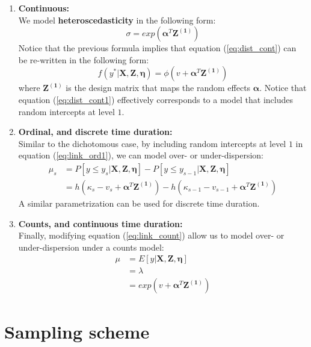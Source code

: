 \begin{enumerate}
	\item \textbf{Continuous:} \\
	We model \textbf{heteroscedasticity} in the following form:
	\begin{equation} \label{eq:het_cont}
		\sigma = exp(\pmb{\alpha}^{T}\mathbf{Z^{(1)}})
	\end{equation}
	Notice that the previous formula implies that equation (\ref{eq:dist_cont}) can be re-written in the following form:
	\begin{equation} \label{eq:dist_cont1}
		f(y^{*}| \mathbf{X}, \mathbf{Z}, \pmb{\eta}) = \phi(v + \pmb{\alpha}^{T}\mathbf{Z^{(1)}})
	\end{equation}
	where $\mathbf{Z^{(1)}}$ is the design matrix that maps the random effects $\pmb{\alpha}$. Notice that equation (\ref{eq:dist_cont1}) effectively corresponds to a model that includes random intercepts at level $1$. 
	
	
	\item \textbf{Ordinal, and discrete time duration:} \\
	Similar to the dichotomous case, by including random intercepts at level $1$ in equation (\ref{eq:link_ord1}), we can model over- or under-dispersion:
	\begin{equation} \label{eq:link_ord3}
		\begin{split}
			\mu_{s} &= P[y \leq y_{s} | \mathbf{X}, \mathbf{Z}, \pmb{\eta}] - P[y \leq y_{s-1} | \mathbf{X}, \mathbf{Z}, \pmb{\eta}] \\
			&= h(\kappa_{s} - v_{s} + \pmb{\alpha}^{T}\mathbf{Z^{(1)}}) - h(\kappa_{s-1} - v_{s-1} + \pmb{\alpha}^{T}\mathbf{Z^{(1)}})
		\end{split}
	\end{equation}
	A similar parametrization can be used for discrete time duration.
	
	
	\item \textbf{Counts, and continuous time duration:} \\
	Finally, modifying equation (\ref{eq:link_count}) allow us to model over- or under-dispersion under a counts model:
	\begin{equation} \label{eq:link_count1}
		\begin{split}
			\mu &= E[y | \mathbf{X}, \mathbf{Z}, \pmb{\eta}] \\
			&= \lambda \\
			&= exp(v + \pmb{\alpha}^{T}\mathbf{Z^{(1)}})
		\end{split}
	\end{equation}
	
\end{enumerate}



\section{Sampling scheme}